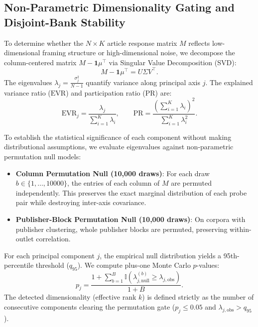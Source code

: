 \subsection{Non-Parametric Dimensionality Gating and Disjoint-Bank Stability}
\label{sec:meth_dimensionality}

To determine whether the $N \times K$ article response matrix $M$ reflects low-dimensional framing structure or high-dimensional noise, we decompose the column-centered matrix $M - \mathbf{1}\mu^\top$ via Singular Value Decomposition (SVD):
\begin{equation}
    M - \mathbf{1}\mu^\top = U \Sigma V^\top.
\end{equation}
The eigenvalues $\lambda_j = \frac{\sigma_j^2}{N-1}$ quantify variance along principal axis $j$. The explained variance ratio ($\mathrm{EVR}$) and participation ratio ($\mathrm{PR}$) are:
\begin{equation}
    \mathrm{EVR}_j = \frac{\lambda_j}{\sum_{i=1}^K \lambda_i}, \qquad \mathrm{PR} = \frac{\left(\sum_{i=1}^K \lambda_i\right)^2}{\sum_{i=1}^K \lambda_i^2}.
\end{equation}

To establish the statistical significance of each component without making distributional assumptions, we evaluate eigenvalues against non-parametric permutation null models:
\begin{itemize}
    \item \textbf{Column Permutation Null (10,000 draws)}: For each draw $b \in \{1, \ldots, 10000\}$, the entries of each column of $M$ are permuted independently. This preserves the exact marginal distribution of each probe pair while destroying inter-axis covariance.
    \item \textbf{Publisher-Block Permutation Null (10,000 draws)}: On corpora with publisher clustering, whole publisher blocks are permuted, preserving within-outlet correlation.
\end{itemize}
For each principal component $j$, the empirical null distribution yields a 95th-percentile threshold ($q_{95}$). We compute plus-one Monte Carlo $p$-values:
\begin{equation}
    p_j = \frac{1 + \sum_{b=1}^{B} \mathbb{I}\left(\lambda_{j,\text{null}}^{(b)} \ge \lambda_{j,\text{obs}}\right)}{1 + B}.
\end{equation}
The detected dimensionality (effective rank $k$) is defined strictly as the number of consecutive components clearing the permutation gate ($p_j \le 0.05$ and $\lambda_{j,\text{obs}} > q_{95}$).

